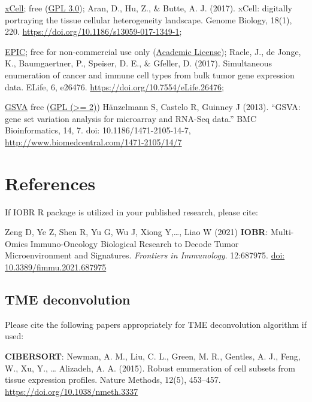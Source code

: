 \documentclass[
  12pt,
]{book}
\begin{document}
\href{http://xcell.ucsf.edu/}{xCell}; free (\href{https://github.com/dviraran/xCell/blob/master/DESCRIPTION}{GPL 3.0}); Aran, D., Hu, Z., \& Butte, A. J. (2017). xCell: digitally portraying the tissue cellular heterogeneity landscape. Genome Biology, 18(1), 220. \url{https://doi.org/10.1186/s13059-017-1349-1};

\href{https://gfellerlab.shinyapps.io/EPIC_1-1/}{EPIC}; free for non-commercial use only (\href{https://github.com/GfellerLab/EPIC/blob/master/LICENSE}{Academic License}); Racle, J., de Jonge, K., Baumgaertner, P., Speiser, D. E., \& Gfeller, D. (2017). Simultaneous enumeration of cancer and immune cell types from bulk tumor gene expression data. ELife, 6, e26476. \url{https://doi.org/10.7554/eLife.26476};

\href{http://www.bioconductor.org/packages/release/bioc/html/GSVA.html}{GSVA} free (\href{https://github.com/rcastelo/GSVA}{GPL (\textgreater= 2)}) Hänzelmann S, Castelo R, Guinney J (2013). ``GSVA: gene set variation analysis for microarray and RNA-Seq data.'' BMC Bioinformatics, 14, 7. doi: 10.1186/1471-2105-14-7, \url{http://www.biomedcentral.com/1471-2105/14/7} \textbar{}

\hypertarget{references-1}{%
\chapter{\texorpdfstring{\textbf{References}}{References}}\label{references-1}}

If IOBR R package is utilized in your published research, please cite:

Zeng D, Ye Z, Shen R, Yu G, Wu J, Xiong Y,\ldots, Liao W (2021) \textbf{IOBR}: Multi-Omics Immuno-Oncology Biological Research to Decode Tumor Microenvironment and Signatures. \emph{Frontiers in Immunology}. 12:687975. \href{https://www.frontiersin.org/articles/10.3389/fimmu.2021.687975/full}{doi: 10.3389/fimmu.2021.687975}

\hypertarget{tme-deconvolution-1}{%
\section{TME deconvolution}\label{tme-deconvolution-1}}

Please cite the following papers appropriately for TME deconvolution algorithm if used:

\textbf{CIBERSORT}: Newman, A. M., Liu, C. L., Green, M. R., Gentles, A. J., Feng, W., Xu, Y., \ldots{} Alizadeh, A. A. (2015). Robust enumeration of cell subsets from tissue expression profiles. Nature Methods, 12(5), 453--457. \url{https://doi.org/10.1038/nmeth.3337}
\end{document}
